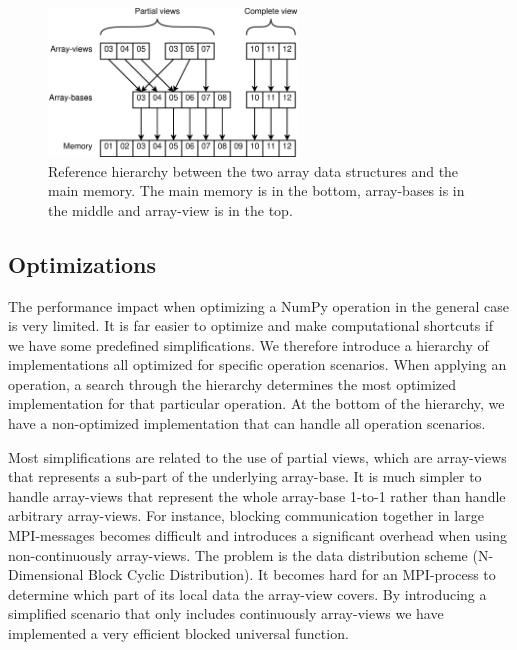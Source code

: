 \documentclass[10pt]{article}
\begin{document}
\begin{figure}
 \centering
 \includegraphics[width=250px]{gfx/views}
 \caption{Reference hierarchy between the two array data structures and the main memory. The main memory is in the bottom, array-bases is in the middle and array-view is in the top.}
 \label{fig:views}
\end{figure}

\subsection{Optimizations}
The performance impact when optimizing a NumPy operation in the general case is very limited. It is far easier to optimize and make computational shortcuts if we have some predefined simplifications. We therefore introduce a hierarchy of implementations all optimized for specific operation scenarios. When applying an operation, a search through the hierarchy determines the most optimized implementation for that particular operation. At the bottom of the hierarchy, we have a non-optimized implementation that can handle all operation scenarios.

Most simplifications are related to the use of partial views, which are array-views that represents a sub-part of the underlying array-base. It is much simpler to handle array-views that represent the whole array-base 1-to-1 rather than handle arbitrary array-views. For instance, blocking communication together in large MPI-messages becomes difficult and introduces a significant overhead when using non-continuously array-views. The problem is the data distribution scheme (N-Dimensional Block Cyclic Distribution). It becomes hard for an MPI-process to determine which part of its local data the array-view covers. By introducing a simplified scenario that only includes continuously array-views we have implemented a very efficient blocked universal function.
\end{document}
